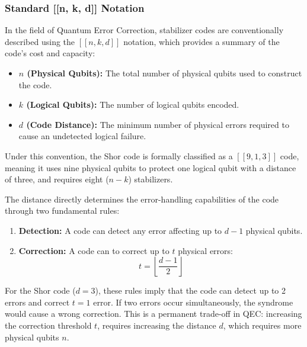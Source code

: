 \subsubsection{Standard [[n, k, d]] Notation}

In the field of Quantum Error Correction, stabilizer codes are conventionally described using the $[[n, k, d]]$ notation, which provides a summary of the code's cost and capacity:

\begin{itemize}
    \item \textbf{$n$ (Physical Qubits):} The total number of physical qubits used to construct the code.
    \item \textbf{$k$ (Logical Qubits):} The number of logical qubits encoded.
    \item \textbf{$d$ (Code Distance):} The minimum number of physical errors required to cause an undetected logical failure.
\end{itemize}

Under this convention, the Shor code is formally classified as a $[[9, 1, 3]]$ code, meaning it uses nine physical qubits to protect one logical qubit with a distance of three, and requires eight ($n-k$) stabilizers.

The distance directly determines the error-handling capabilities of the code through two fundamental rules:

\begin{enumerate}
    \item \textbf{Detection:} A code can detect any error affecting up to $d-1$ physical qubits.
    \item \textbf{Correction:} A code can to correct up to $t$ physical errors:
    \begin{equation}
        t = \left\lfloor \frac{d - 1}{2} \right\rfloor
    \end{equation}
\end{enumerate}

For the Shor code ($d=3$), these rules imply that the code can detect up to 2 errors and correct $t=1$ error. If two errors occur simultaneously, the syndrome would cause a wrong correction. This is a permanent trade-off in QEC: increasing the correction threshold $t$, requires increasing the distance $d$, which requires more physical qubits $n$.